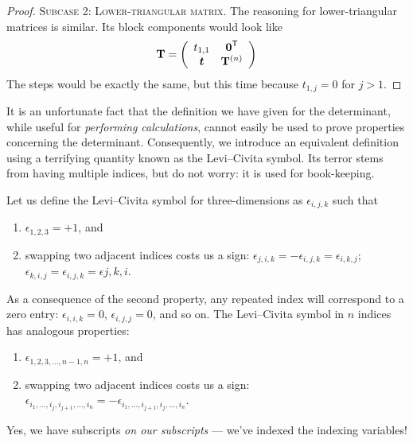 \begin{proof}
\textsc{Subcase 2: Lower-triangular matrix.}
The reasoning for lower-triangular matrices is similar. Its block
components would look like
\begin{equation}
    \mathbf{T} = \left(\begin{array}{cc}
      t_{1,1} & \boldsymbol{0}^{\mathsf{T}} \\
      \boldsymbol{t} & \mathbf{T}^{(n)}
    \end{array}\right)
  \end{equation}
The steps would be exactly the same, but this time because $t_{1,j}=0$
for $j>1$.
\end{proof}

It is an unfortunate fact that the definition we have given for the
determinant, while useful for \emph{performing calculations}, cannot
easily be used to prove properties concerning the
determinant. Consequently, we introduce an equivalent definition using a
terrifying quantity known as the Levi--Civita symbol. Its terror stems
from having multiple indices, but do not worry: it is used for book-keeping.

Let us define the Levi--Civita symbol for three-dimensions as
$\epsilon_{i,j,k}$ such that
\begin{enumerate}
\item $\epsilon_{1,2,3}=+1$, and
\item swapping two adjacent indices costs us a sign: $\epsilon_{j,i,k}=-\epsilon_{i,j,k}=\epsilon_{i,k,j}$;
$\epsilon_{k,i,j}=\epsilon_{i,j,k}=\epsilon{j,k,i}$.
\end{enumerate}
As a consequence of the second property, any repeated index will
correspond to a zero entry: $\epsilon_{i,i,k}=0$, $\epsilon_{i,j,j}=0$,
and so on. The Levi--Civita symbol in $n$ indices has analogous
properties:
\begin{enumerate}
\item $\epsilon_{1,2,3,\dots,n-1,n}=+1$, and
\item swapping two adjacent indices costs us a sign:
  $\epsilon_{i_{1},\dots,i_{j},i_{j+1},\dots,i_{n}}=-\epsilon_{i_{1},\dots,i_{j+1},i_{j},\dots,i_{n}}$.
\end{enumerate}
Yes, we have subscripts \emph{on our subscripts} --- we've indexed the
indexing variables!

